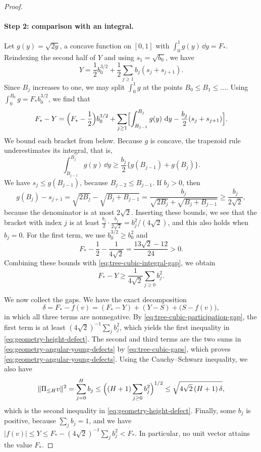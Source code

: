 \begin{proof}
\paragraph{Step 2: comparison with an integral.}
Let $g(y)=\sqrt{2y}$, a concave function on $[0,1]$ with $\int_0^1g(y)\,\dd y=F_*$. Reindexing the second half of $Y$ and using $s_1=\sqrt{b_0}$, we have
\[
 Y=\frac12b_0^{3/2}+\frac12\sum_{j\ge1}b_j(s_j+s_{j+1}).
\]
Since $B_j$ increases to one, we may split $\int_0^1g$ at the points $B_0\le B_1\le\dots$. Using $\int_0^{B_0}g=F_*b_0^{3/2}$, we find that
\begin{equation}\label{eq:tree-cubic-integral-gap}
 F_*-Y=\Bigl(F_*-\frac12\Bigr)b_0^{3/2}
 +\sum_{j\ge1}\Bigl[\int_{B_{j-1}}^{B_j}g(y)\,\mathop{}\!\mathrm d y-\frac{b_j}{2}(s_j+s_{j+1})\Bigr].
\end{equation}
We bound each bracket from below. Because $g$ is concave, the trapezoid rule underestimates its integral, that is,
\[
 \int_{B_{j-1}}^{B_j}g(y)\,\dd y\ge\frac{b_j}2\bigl\{g(B_{j-1})+g(B_j)\bigr\}.
\]
We have $s_j\le g(B_{j-1})$, because $B_{j-2}\le B_{j-1}$. If $b_j>0$, then
\[
 g(B_j)-s_{j+1}=\sqrt{2B_j}-\sqrt{B_j+B_{j-1}}
 =\frac{b_j}{\sqrt{2B_j}+\sqrt{B_j+B_{j-1}}}\ge\frac{b_j}{2\sqrt2},
\]
because the denominator is at most $2\sqrt2$. Inserting these bounds, we see that the bracket with index $j$ is at least $\frac{b_j}2\cdot\frac{b_j}{2\sqrt2}=b_j^2/(4\sqrt2)$, and this also holds when $b_j=0$. For the first term, we use $b_0^{3/2}\ge b_0^2$ and
\[
 F_*-\frac12-\frac1{4\sqrt2}=\frac{13\sqrt2-12}{24}>0.
\]
Combining these bounds with \eqref{eq:tree-cubic-integral-gap}, we obtain
\begin{equation}\label{eq:tree-cubic-participation-gap}
 F_*-Y\ge\frac1{4\sqrt2}\sum_{j\ge0}b_j^2.
\end{equation}

We now collect the gaps. We have the exact decomposition
\[
 \delta=F_*-f(v)=(F_*-Y)+(Y-S)+\bigl(S-f(v)\bigr),
\]
in which all three terms are nonnegative. By \eqref{eq:tree-cubic-participation-gap}, the first term is at least $(4\sqrt2)^{-1}\sum_jb_j^2$, which yields the first inequality in \eqref{eq:geometry-height-defect}. The second and third terms are the two sums in \eqref{eq:geometry-angular-young-defects} by \eqref{eq:tree-cubic-gaps}, which proves \eqref{eq:geometry-angular-young-defects}. Using the Cauchy--Schwarz inequality, we also have
\[
 \lVert\Pi_{\le H}v\rVert^2=\sum_{j=0}^Hb_j\le\Bigl((H+1)\sum_{j\ge0}b_j^2\Bigr)^{1/2}\le\sqrt{4\sqrt2\,(H+1)\,\delta},
\]
which is the second inequality in \eqref{eq:geometry-height-defect}. Finally, some $b_j$ is positive, because $\sum_jb_j=1$, and we have $|f(v)|\le Y\le F_*-(4\sqrt2)^{-1}\sum_jb_j^2<F_*$. In particular, no unit vector attains the value $F_*$.


\end{proof}
